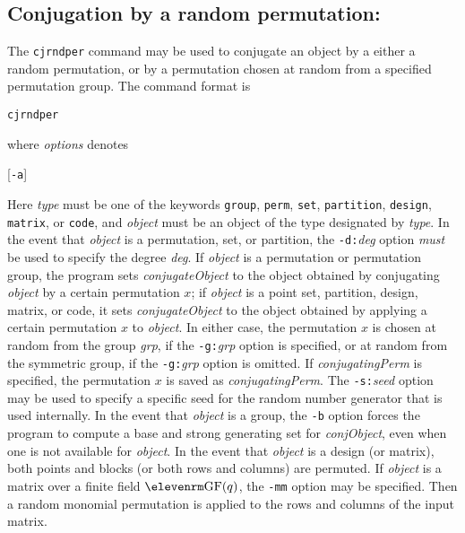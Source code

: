 %
\subsection{Conjugation by a random permutation:}The {\tt cjrndper}
command may be used to conjugate an object by a either a random permutation,
or by a permutation chosen at random from a specified permutation group.  The command
format is
%
\smallskip
\centerline{{\tt cjrndper}\quad [{\it conjugatingPerm\/}]}
\smallskip
where {\it options\/} denotes
\smallskip
\centerline{
        [{\tt -a}]\kern-1pt\enskip
        [{\tt -b}]\kern-1pt\enskip
        [{\tt -d:}{\it deg\/}]\kern-1pt\enskip
        [{\tt -g:}{\it grp\/}]\kern-1pt\enskip
        [{\tt -i}]\kern-1pt\enskip
        [{\tt -mb:}$k$]\kern-1pt\enskip
        [{\tt -mm}]\kern-1pt\enskip
        [{\tt -mw:}$w$]\kern-1pt\enskip
        [{\tt -n:}{\it name}]\kern-1pt\enskip
        [{\tt -p:}{\it path\/}]\kern-1pt\enskip
        [{\tt -s:}{\it seed\/}]\kern-1pt\enskip
        [{\tt -q}]}
\smallskip
Here {\it type\/} must be one of the keywords {\tt group}, {\tt perm},
{\tt set}, {\tt partition}, {\tt design}, {\tt matrix}, or {\tt code},\enskip
and {\it object\/} must be an object of the type designated by {\it type}.
In the event that {\it object\/}
is a permutation, set, or partition, the {\tt -d:}{\it deg} option {\it must}
be used to specify the degree {\it deg}.  If {\it object\/} is a permutation
or permutation group, the program sets
{\it conjugateObject\/} to the object obtained by conjugating {\it object\/}
by a certain permutation $x$; if {\it object\/} is a point set, partition,
design, matrix, or code, it sets {\it conjugateObject\/} to the
object obtained by applying a certain permutation $x$ to {\it object}.
In either case, the permutation $x$ is
chosen at random from the group {\it grp}, if the {\tt -g:}{\it grp} option
is specified, or at random from the symmetric group, if the
{\tt -g:}{\it grp} option is omitted.  If {\it conjugatingPerm\/} is specified, 
the permutation $x$ is saved as {\it conjugatingPerm}.
The {\tt -s:}{\it seed} option may be used to specify
a specific seed for the random number generator that is used internally.
In the event that {\it object\/} is a group, the {\tt -b} option forces the
program to compute a base and strong generating set for {\it conjObject}, even
when one is not available for {\it object}.
\medbreak
In the event that {\it object\/} is a design (or matrix), both points
and blocks (or both rows and columns) are permuted.
\medbreak
If {\it object\/} is a matrix over a finite field ${\rm GF}(q)$, the {\tt -mm}
option may be specified.  Then a random monomial permutation is applied
to the rows and columns of the input matrix.
%
%
%
